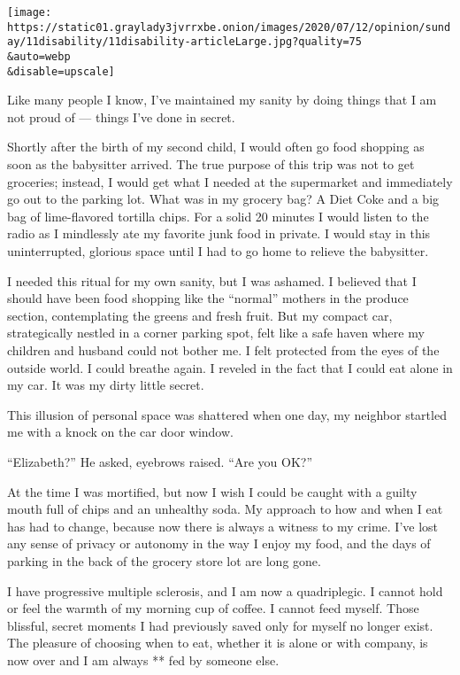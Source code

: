 \texttt{[image: https://static01.graylady3jvrrxbe.onion/images/2020/07/12/opinion/sunday/11disability/11disability-articleLarge.jpg?quality=75\\\&auto=webp\\\&disable=upscale]}

Like many people I know, I've maintained my sanity by doing things that
I am not proud of --- things I've done in secret.

Shortly after the birth of my second child, I would often go food
shopping as soon as the babysitter arrived. The true purpose of this
trip was not to get groceries; instead, I would get what I needed at the
supermarket and immediately go out to the parking lot. What was in my
grocery bag? A Diet Coke and a big bag of lime-flavored tortilla chips.
For a solid 20 minutes I would listen to the radio as I mindlessly ate
my favorite junk food in private. I would stay in this uninterrupted,
glorious space until I had to go home to relieve the babysitter.

I needed this ritual for my own sanity, but I was ashamed. I believed
that I should have been food shopping like the ``normal'' mothers in the
produce section, contemplating the greens and fresh fruit. But my
compact car, strategically nestled in a corner parking spot, felt like a
safe haven where my children and husband could not bother me. I felt
protected from the eyes of the outside world. I could breathe again. I
reveled in the fact that I could eat alone in my car. It was my dirty
little secret.

This illusion of personal space was shattered when one day, my neighbor
startled me with a knock on the car door window.

``Elizabeth?'' He asked, eyebrows raised. ``Are you OK?''

At the time I was mortified, but now I wish I could be caught with a
guilty mouth full of chips and an unhealthy soda. My approach to how and
when I eat has had to change, because now there is always a witness to
my crime. I've lost any sense of privacy or autonomy in the way I enjoy
my food, and the days of parking in the back of the grocery store lot
are long gone.

I have progressive multiple sclerosis, and I am now a quadriplegic. I
cannot hold or feel the warmth of my morning cup of coffee. I cannot
feed myself. Those blissful, secret moments I had previously saved only
for myself no longer exist. The pleasure of choosing when to eat,
whether it is alone or with company, is now over and I am always ** fed
by someone else.

